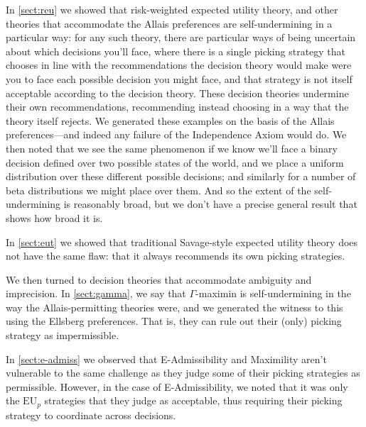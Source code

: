 \documentclass[a4paper]{article}
\renewcommand\P{\mathbb{P}} %
\newcommand\EU{\mathrm{EU}}
\newcommand{\IP}{\P}
\newenvironment{CCM rewritten}
{\begingroup\color{blue}} %
{\endgroup}              %
\begin{document}
In \cref{sect:reu} we showed that risk-weighted expected utility theory, and other theories that accommodate the Allais preferences are self-undermining in a particular way: for any such theory, there are particular ways of being uncertain about which decisions you'll face, where there is a single picking strategy that chooses in line with the recommendations the decision theory would make were you to face each possible decision you might face, and that strategy is not itself acceptable according to the decision theory. These decision theories undermine their own recommendations, recommending instead choosing in a way that the theory itself rejects. We generated these examples on the basis of the Allais preferences---and indeed any failure of the Independence Axiom would do. We then noted that we see the same phenomenon if we know we'll face a binary decision defined over two possible states of the world, and we place a uniform distribution over these different possible decisions; and similarly for a number of beta distributions we might place over them. And so the extent of the self-undermining is reasonably broad, but we don't have a precise general result that shows how broad it is.

In \cref{sect:eut} we showed that traditional Savage-style expected utility theory does not have the same flaw: that it always recommends its own picking strategies.

We then turned to decision theories that accommodate ambiguity and imprecision. In \cref{sect:gamma}, we say that $\Gamma$-maximin is self-undermining in the way the Allais-permitting theories were, and we generated the witness to this using the Ellsberg preferences. That is, they can rule out their (only) picking strategy as impermissible. 

In \cref{sect:e-admiss} we observed that E-Admissibility and Maximility aren't vulnerable to the same challenge as they judge some of their picking strategies as permissible. However, in the case of E-Admissibility, we noted that it was only the $\EU_p$ strategies that they judge as acceptable, thus requiring their picking strategy to coordinate across decisions. 

\end{document}
